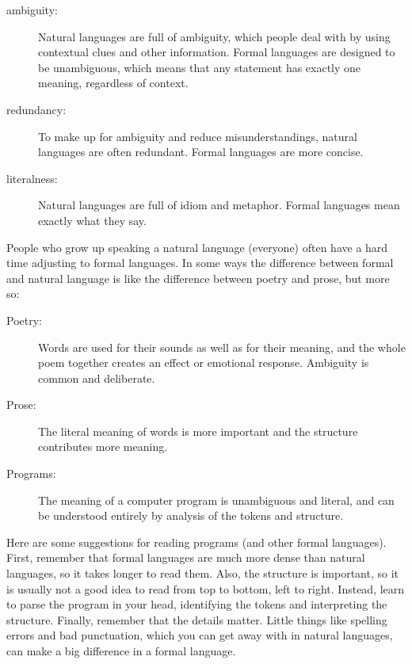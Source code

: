 \documentclass{book}
\begin{document}

\begin{description}

\item[ambiguity:] Natural languages are full of ambiguity, which
  people deal with by using contextual clues and other information.
  Formal languages are designed to be unambiguous, which means that
  any statement has exactly one meaning, regardless of context.

\item[redundancy:] To make up for ambiguity and reduce
  misunderstandings, natural languages are often redundant.  Formal
  languages are more concise.

\item[literalness:] Natural languages are full of idiom and
metaphor.  Formal languages mean exactly what they say.

\end{description}

People who grow up speaking a natural language (everyone) often have a
hard time adjusting to formal languages.  In some ways the difference
between formal and natural language is like the difference between
poetry and prose, but more so:


\begin{description}

\item[Poetry:] Words are used for their sounds as well as for
their meaning, and the whole poem together creates an effect or
emotional response.  Ambiguity is common and deliberate.

\item[Prose:] The literal meaning of words is more important
and the structure contributes more meaning.

\item[Programs:] The meaning of a computer program is unambiguous
and literal, and can be understood entirely by analysis of the
tokens and structure.

\end{description}

Here are some suggestions for reading programs (and other formal
languages).  First, remember that formal languages are much more dense
than natural languages, so it takes longer to read them.  Also, the
structure is important, so it is usually not a good idea to read
from top to bottom, left to right.  Instead, learn to parse the
program in your head, identifying the tokens and interpreting the
structure.  Finally, remember that the details matter.  Little things
like spelling errors and bad punctuation, which you can get away
with in natural languages, can make a big difference in a formal
language.
\end{document}
